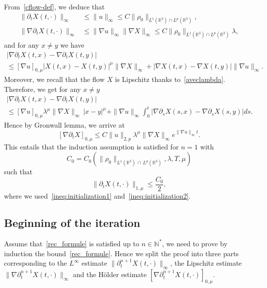 \documentclass[AHL,Unicode,longabstracts,published]{cedram}
\newcommand{\R}{\mathbb{R}}
\newcommand{\N}{\mathbb{N}}
\renewcommand{\leq}{\leqslant}
\begin{document}
From~\eqref{cflow-def}, we deduce that
\begin{align}
\|\partial_t X(t,\cdot)\|_\infty &\leq \|u\|_\infty \leq C \|\rho_0\|_{L^1(\R^3)\cap L^p(\R^3)},\label{ineq:initialization1}
\\
\|\nabla \partial_t X(t,\cdot)\|_\infty &\leq \|\nabla u\|_\infty \|\nabla X \|_\infty \leq C \|\rho_0\|_{L^1(\R^3)\cap L^p(\R^3)} \lambda, \label{ineq:initialization2}
\end{align}
and for any $x \neq y$ we have
\begin{multline*}
\big|\nabla \partial_t X(t,x)-\nabla \partial_t X(t,y)\big| \\
\leq [\nabla u]_{0,\mu}|X(t,x)-X(t,y)|^\mu \|\nabla X\|_\infty + |\nabla X(t,x)-\nabla X(t,y)| \|\nabla u\|_\infty.
\end{multline*}
Moreover, we recall that the flow $X$ is Lipschitz thanks to~\eqref{aveclambda}. Therefore, we get for any $x \neq y $
\begin{multline*}
\big|\nabla \partial_t X(t,x)-\nabla \partial_t X(t,y)\big| \\ \leq [\nabla u]_{0,\mu} \lambda^\mu \|\nabla X\|_\infty\, |x-y|^\mu +
\|\nabla u\|_\infty \int_0^t\big|\nabla \partial_s X(s,x)-\nabla\partial_s X(s,y)\big|ds.
\end{multline*}
Hence by Gronwall lemma, we arrive at
\[
[\nabla \partial_t X]_{0,\mu} \leq C\|u\|_{2,p}\lambda^\mu \|\nabla X\|_\infty e^{\|\nabla u\|_\infty t}.
\]
This entails that the induction assumption is satisfied
for $n=1$ with
\[
C_0=C_0\left(\|\rho_0\|_{L^1(\R^3)\,\cap\,L^p(\R^3)}, \lambda, T,\mu\right)
\]
such that
\begin{equation}
\|\partial_t X(t,\cdot)\|_{1,\mu} \leq \frac{C_0}{2},
\end{equation}
where we used~\eqref{ineq:initialization1} and~\eqref{ineq:initialization2}.



\subsection{Beginning of the iteration}

Assume that~\eqref{rec_formule} is satisfied up to $n \in \N^*$, we need to prove by induction the bound~\eqref{rec_formule}. Hence we split the proof into three parts corresponding to the $L^\infty$ estimate $\|\partial_t^{n+1} X(t,\cdot)\|_\infty$, the Lipschitz estimate $\|\nabla \partial_t^{n+1} X(t,\cdot)\|_\infty$ and the H\"older estimate $[\nabla \partial_t^{n+1} X(t,\cdot)]_{0,\mu}$.
\end{document}
